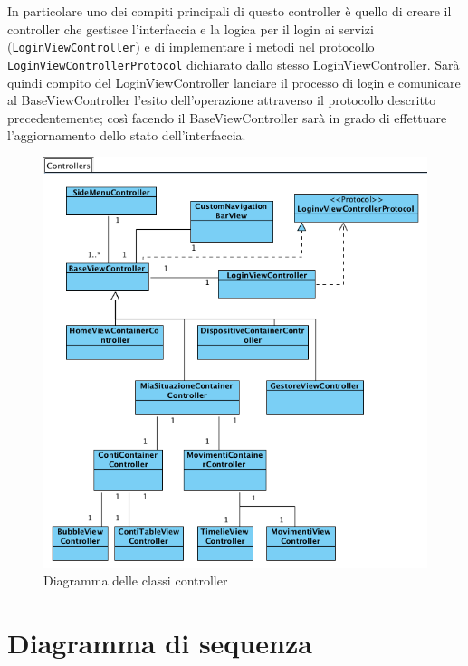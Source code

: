 In particolare uno dei compiti principali di questo controller è quello di creare il controller che gestisce l'interfaccia e la logica per il login ai servizi (\texttt{LoginViewController}) e di implementare i metodi nel  protocollo \texttt{LoginViewControllerProtocol} dichiarato dallo stesso LoginViewController. Sarà quindi compito del LoginViewController  lanciare il processo di login e comunicare al BaseViewController l'esito dell'operazione attraverso il protocollo descritto precedentemente; così facendo il BaseViewController sarà in grado di effettuare l'aggiornamento dello stato dell'interfaccia.


 \newpage
\begin{figure}[!htbp]
\centering
\includegraphics[scale=0.65]{architettura/controllersNew.png}
\caption{Diagramma delle classi controller}
\end{figure}



\section{Diagramma di sequenza}


